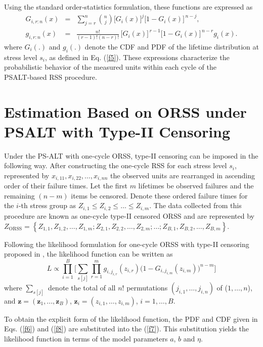 \documentclass[twoside]{article}
\begin{document}
Using the standard order‑statistics formulation, these functions are expressed as
\begin{eqnarray}
\label{f6}
G_{i,r:n}(x) &= & \sum_{j=r}^{n}
\binom{n}{j}
\big[G_i(x)\big]^{j}
\big[1 - G_i(x)\big]^{\,n-j},
\\
\label{f8}
g_{i,r:n}(x) & = & \frac{n!}{(r-1)!(n-r)!}\,
\big[G_i(x)\big]^{\,r-1}
\big[1 - G_i(x)\big]^{\,n-r}
g_i(x).
\end{eqnarray}
where $G_i(.)$ and $g_i(.)$ denote the CDF and PDF of the lifetime distribution at stress level $s_i$, as defined in Eq. (\ref{f5}). These expressions characterize the probabilistic behavior of the measured units within each cycle of the PSALT‑based RSS procedure.


\section{Estimation Based on ORSS under PSALT with Type-II Censoring}

Under the PS‑ALT with one‑cycle ORSS, type‑II censoring can be imposed in the following way. After constructing the one‑cycle RSS for each stress level $s_i$, represented by $x_{i,11}, x_{i,22}, \dots, x_{i,nn}$ the observed units are rearranged in ascending order of their failure times. Let the first $m$ lifetimes be observed failures and the remaining $(n-m)$ items be censored. Denote these ordered failure times for the $i$-th stress group as $Z_{i,1} \leq Z_{i,2} \leq \dots \leq Z_{i,m}$. The  data collected from this
procedure are known as one-cycle type-II censored ORSS and are represented by
$
Z_{\mathrm{ORSS}}
=
\left\{
Z_{1,1}, Z_{1,2}, \ldots, Z_{1,m};
Z_{2,1}, Z_{2,2}, \ldots, Z_{2,m};
\ldots;
Z_{B,1}, Z_{B,2}, \ldots, Z_{B,m}
\right\}.
$

Following the likelihood formulation for one-cycle ORSS with type-II censoring proposed in \cite{Balakrishnan2007}, the likelihood function can be written as
\begin{equation}
\label{f7}
L \propto \prod_{i=1}^{B} \Big[ \sum_{s[j]} \prod_{r=1}^{m} g_{i,j_{i,r}}(z_{i,r}) \Big(1-G_{i,j_{i,m}}(z_{i,m}) \Big)^{n-m}  \Big]
\end{equation}
where $\sum_{s[j]}$ denote the total of all $n !$ permutations $(j_{i,1}, \dots, j_{i,n})$ of ($1,\dots,n$), and $\textbf{z}=(\textbf{z}_1,...,\textbf{z}_B)$, $\textbf{z}_i=(z_{i,1}, \dots, z_{i,m})$, $i=1, \dots,B$.

To obtain the explicit form of the likelihood function, the PDF and CDF given in Eqs. (\ref{f6}) and (\ref{f8}) are substituted into the (\ref{f7}). This substitution yields the  likelihood function in terms of the model parameters $a$, $b$ and $\eta$.
\end{document}
